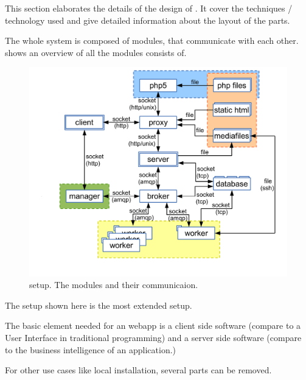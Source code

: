 

This section elaborates the details of the design of \spl.
It cover the techniques / technology used and give detailed information about the layout of the parts.

The whole system is composed of modules, that communicate with each other.
 shows an overview of all the modules \spl consists of.

\begin{figure}[htbp]
  \centering
    \includegraphics[width=\figwidth]{fig/whole_setup.pdf}
  \caption{\spl setup. The modules and their communicaion.}
  \label{fig:whole_setup}
\end{figure}

The setup shown here is the most extended setup.

The basic element needed for an webapp is a client side software (compare to a User Interface in traditional programming) and a server side software (compare to the business intelligence of an application.)


For other use cases like local installation, several parts can be removed.




